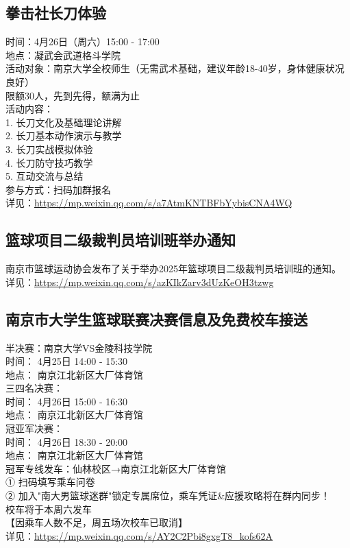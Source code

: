 \documentclass[letterpaper, 12pt]{article}
\begin{document}
\begin{multicols}{2}
\subsection{拳击社长刀体验} %
时间：4月26日（周六）15:00 - 17:00
\\地点：凝武会武道格斗学院
\\活动对象：南京大学全校师生（无需武术基础，建议年龄18-40岁，身体健康状况良好）
\\限额30人，先到先得，额满为止
\\活动内容：
\\1. 长刀文化及基础理论讲解
\\2. 长刀基本动作演示与教学
\\3. 长刀实战模拟体验
\\4. 长刀防守技巧教学
\\5. 互动交流与总结
\\参与方式：扫码加群报名
\\详见：\url{https://mp.weixin.qq.com/s/a7AtmKNTBFbYybisCNA4WQ}

\subsection{篮球项目二级裁判员培训班举办通知} %
南京市篮球运动协会发布了关于举办2025年篮球项目二级裁判员培训班的通知。
\\详见：\url{https://mp.weixin.qq.com/s/azKIkZarv3dUzKeOH3tzwg}

\subsection{南京市大学生篮球联赛决赛信息及免费校车接送} %
半决赛：南京大学VS金陵科技学院
\\时间： 4月25日 14:00 - 15:30
\\地点： 南京江北新区大厂体育馆
\\三四名决赛：
\\时间： 4月26日 15:00 - 16:30
\\地点： 南京江北新区大厂体育馆
\\冠亚军决赛：
\\时间： 4月26日 18:30 - 20:00
\\地点： 南京江北新区大厂体育馆
\\冠军专线发车：仙林校区→南京江北新区大厂体育馆
\\① 扫码填写乘车问卷
\\② 加入"南大男篮球迷群"锁定专属席位，乘车凭证\&应援攻略将在群内同步！
\\校车将于本周六发车
\\【因乘车人数不足，周五场次校车已取消】
\\详见：\url{https://mp.weixin.qq.com/s/AY2C2Pbi8gxgT8_kofs62A}


\end{multicols}
\end{document}

